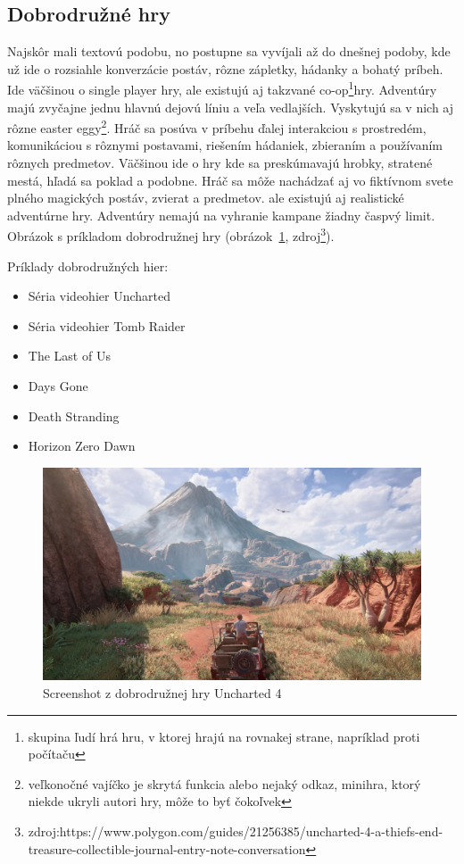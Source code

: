 \documentclass[10pt,oneside,slovak,a4paper]{article}
\begin{document}
\subsection{Dobrodružné hry} \label{zanre:adventure}

Najskôr mali textovú podobu, no postupne sa vyvíjali až do dnešnej podoby, kde už ide o rozsiahle konverzácie postáv, rôzne zápletky, hádanky a bohatý príbeh. Ide väčšinou o single player hry, ale existujú aj takzvané co-op\footnote{skupina ľudí hrá hru, v ktorej hrajú na rovnakej strane, napríklad proti počítaču}hry. Adventúry majú zvyčajne jednu hlavnú dejovú líniu a veľa vedlajších. Vyskytujú sa v nich aj rôzne easter eggy\footnote{veľkonočné vajíčko je skrytá funkcia alebo nejaký odkaz, minihra, ktorý niekde ukryli autori hry, môže to byť čokoľvek }. Hráč sa posúva v príbehu ďalej interakciou s prostredém, komunikáciou s rôznymi postavami, riešením hádaniek, zbieraním a používaním rôznych predmetov. Väčšinou ide o hry kde sa preskúmavajú hrobky, stratené mestá, hľadá sa poklad a podobne. Hráč sa môže nachádzať aj vo fiktívnom svete plného magických postáv, zvierat a predmetov. ale existujú aj realistické adventúrne hry. Adventúry nemajú na vyhranie kampane žiadny časpvý limit. Obrázok s príkladom dobrodružnej hry (obrázok~\ref{f:uncharted}, zdroj\footnote{zdroj:https://www.polygon.com/guides/21256385/uncharted-4-a-thiefs-end-treasure-collectible-journal-entry-note-conversation}).

Príklady dobrodružných hier:
\begin{itemize}
\item Séria videohier Uncharted
\item Séria videohier Tomb Raider
\item The Last of Us
\item Days Gone
\item Death Stranding
\item Horizon Zero Dawn
\end{itemize}

\begin{figure}[tbh]
\centering
\includegraphics[scale=0.2]{Screenshot.jpg}
\caption{Screenshot z dobrodružnej hry Uncharted 4}
\label{f:uncharted}
\end{figure}
\end{document}
